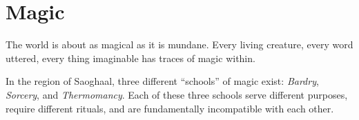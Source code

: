 \chapter{Magic}
The world is about as magical as it is mundane.
Every living creature, every word uttered, every thing imaginable has traces of magic within.

In the region of Saoghaal, three different ``schools'' of magic exist: \textit{Bardry}, \textit{Sorcery}, and \textit{Thermomancy}.
Each of these three schools serve different purposes, require different rituals, and are fundamentally incompatible with each other.



